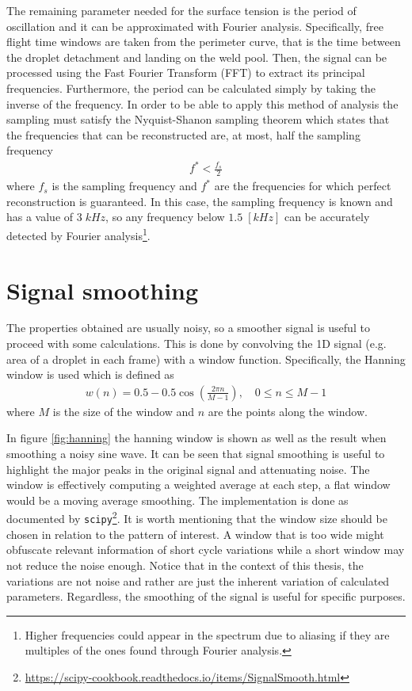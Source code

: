 The remaining parameter needed for the surface tension is the period of oscillation and it can be approximated with Fourier analysis. Specifically, free flight time windows are taken from the perimeter curve, that is the time between the droplet detachment and landing on the weld pool. Then, the signal can be processed using the Fast Fourier Transform (FFT) to extract its principal frequencies. Furthermore, the period can be calculated simply by taking the inverse of the frequency. In order to be able to apply this method of analysis the sampling must satisfy the Nyquist-Shanon sampling theorem which states that the frequencies that can be reconstructed are, at most, half the sampling frequency \cite{shannon}
\begin{align*}
    f^*<\frac{f_s}{2}
\end{align*}
where $f_s$ is the sampling frequency and $f^*$ are the frequencies for which perfect reconstruction is guaranteed. In this case, the sampling frequency is known and has a value of $3\; kHz$, so any frequency below $1.5\;[kHz]$ can be accurately detected by Fourier analysis\footnote{Higher frequencies could appear in the spectrum due to aliasing if they are multiples of the ones found through Fourier analysis.}.

\section{Signal smoothing}
The properties obtained are usually noisy, so a smoother signal is useful to proceed with some calculations. This is done by convolving the 1D signal (e.g. area of a droplet in each frame) with a window function. Specifically, the Hanning window is used which is defined as 
\begin{align*}
    w(n)=0.5-0.5\cos{\left(\frac{2\pi n}{M-1}\right)},\quad 0\leq n\leq M-1
\end{align*}
where $M$ is the size of the window and $n$ are the points along the window.

In figure \ref{fig:hanning} the hanning window is shown as well as the result when smoothing a noisy sine wave. It can be seen that signal smoothing is useful to highlight the major peaks in the original signal and attenuating noise. The window is effectively computing a weighted average at each step, a flat window would be a moving average smoothing. The implementation is done as documented by \texttt{scipy}\footnote{\url{https://scipy-cookbook.readthedocs.io/items/SignalSmooth.html}}. It is worth mentioning that the window size should be chosen in relation to the pattern of interest. A window that is too wide might obfuscate relevant information of short cycle variations while a short window may not reduce the noise enough. Notice that in the context of this thesis, the variations are not noise and rather are just the inherent variation of calculated parameters. Regardless, the smoothing of the signal is useful for specific purposes.

